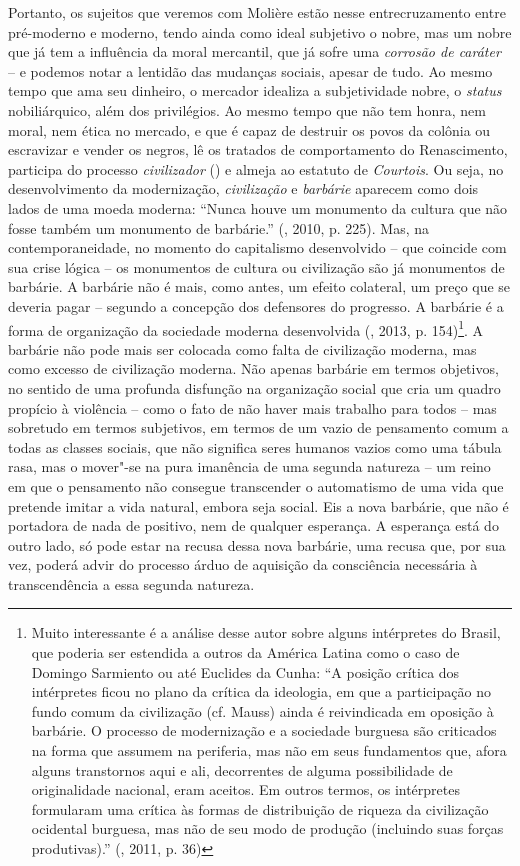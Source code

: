 Portanto, os sujeitos que veremos com Molière estão nesse
entrecruzamento entre pré-moderno e moderno, tendo ainda como ideal
subjetivo o nobre, mas um nobre que já tem a influência da moral
mercantil, que já sofre uma \emph{corrosão de caráter} -- e podemos
notar a lentidão das mudanças sociais, apesar de tudo. Ao mesmo tempo
que ama seu dinheiro, o mercador idealiza a subjetividade nobre, o
\emph{status} nobiliárquico, além dos privilégios. Ao mesmo tempo que
não tem honra, nem moral, nem ética no mercado, e que é capaz de
destruir os povos da colônia ou escravizar e vender os negros, lê os
tratados de comportamento do Renascimento, participa do processo
\emph{civilizador} () e almeja ao estatuto de \emph{Courtois}. Ou
seja, no desenvolvimento da modernização, \emph{civilização} e
\emph{barbárie} aparecem como dois lados de uma moeda moderna: ``Nunca
houve um monumento da cultura que não fosse também um monumento de
barbárie.'' (, 2010, p. 225). Mas, na contemporaneidade, no
momento do capitalismo desenvolvido -- que coincide com sua crise lógica
-- os monumentos de cultura ou civilização são já monumentos de
barbárie. A barbárie não é mais, como antes, um efeito colateral, um
preço que se deveria pagar -- segundo a concepção dos defensores do
progresso. A barbárie é a forma de organização da sociedade moderna
desenvolvida (, 2013, p. 154)\footnote{Muito interessante é a
  análise desse autor sobre alguns intérpretes do Brasil, que poderia
  ser estendida a outros da América Latina como o caso de Domingo
  Sarmiento ou até Euclides da Cunha: ``A posição crítica dos
  intérpretes ficou no plano da crítica da ideologia, em que a
  participação no fundo comum da civilização (cf. Mauss) ainda é
  reivindicada em oposição à barbárie. O processo de modernização e a
  sociedade burguesa são criticados na forma que assumem na periferia,
  mas não em seus fundamentos que, afora alguns transtornos aqui e ali,
  decorrentes de alguma possibilidade de originalidade nacional, eram
  aceitos. Em outros termos, os intérpretes formularam uma crítica às
  formas de distribuição de riqueza da civilização ocidental burguesa,
  mas não de seu modo de produção (incluindo suas forças produtivas).''
  (, 2011, p. 36)}. A barbárie não pode mais ser colocada como
falta de civilização moderna, mas como excesso de civilização moderna.
Não apenas barbárie em termos objetivos, no sentido de uma profunda
disfunção na organização social que cria um quadro propício à violência
-- como o fato de não haver mais trabalho para todos -- mas sobretudo em
termos subjetivos, em termos de um vazio de pensamento comum a todas as
classes sociais, que não significa seres humanos vazios como uma tábula
rasa, mas o mover"-se na pura imanência de uma segunda natureza -- um
reino em que o pensamento não consegue transcender o automatismo de uma
vida que pretende imitar a vida natural, embora seja social. Eis a nova
barbárie, que não é portadora de nada de positivo, nem de qualquer
esperança. A esperança está do outro lado, só pode estar na recusa dessa
nova barbárie, uma recusa que, por sua vez, poderá advir do processo
árduo de aquisição da consciência necessária à transcendência a essa
segunda natureza.

